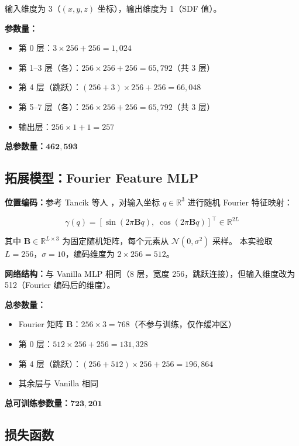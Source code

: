 \documentclass[12pt, a4paper]{article}
\begin{document}
输入维度为 3（$(x, y, z)$ 坐标），输出维度为 1（SDF 值）。

\textbf{参数量：}
\begin{itemize}[noitemsep]
  \item 第 0 层：$3 \times 256 + 256 = 1{,}024$
  \item 第 1–3 层（各）：$256 \times 256 + 256 = 65{,}792$（共 3 层）
  \item 第 4 层（跳跃）：$(256+3) \times 256 + 256 = 66{,}048$
  \item 第 5–7 层（各）：$256 \times 256 + 256 = 65{,}792$（共 3 层）
  \item 输出层：$256 \times 1 + 1 = 257$
\end{itemize}
\textbf{总参数量：}$\mathbf{462{,}593}$

\subsection{拓展模型：Fourier Feature MLP}

\textbf{位置编码：}参考 Tancik 等人 \cite{fourier2020}，对输入坐标 $q \in \mathbb{R}^3$ 进行随机 Fourier 特征映射：

\begin{equation}
  \gamma(q) = \left[\sin(2\pi \mathbf{B} q),\; \cos(2\pi \mathbf{B} q)\right]^\top \in \mathbb{R}^{2L}
\end{equation}

其中 $\mathbf{B} \in \mathbb{R}^{L \times 3}$ 为固定随机矩阵，每个元素从 $\mathcal{N}(0, \sigma^2)$ 采样。
本实验取 $L = 256$，$\sigma = 10$，编码维度为 $2 \times 256 = 512$。

\textbf{网络结构：}与 Vanilla MLP 相同（8 层，宽度 256，跳跃连接），但输入维度改为 512（Fourier 编码后的维度）。

\textbf{总参数量：}
\begin{itemize}[noitemsep]
  \item Fourier 矩阵 $\mathbf{B}$：$256 \times 3 = 768$（不参与训练，仅作缓冲区）
  \item 第 0 层：$512 \times 256 + 256 = 131{,}328$
  \item 第 4 层（跳跃）：$(256+512) \times 256 + 256 = 196{,}864$
  \item 其余层与 Vanilla 相同
\end{itemize}
\textbf{总可训练参数量：}$\mathbf{723{,}201}$

\subsection{损失函数}
\end{document}
